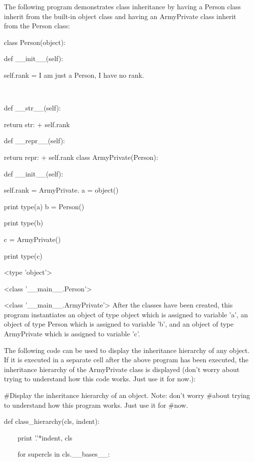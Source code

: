 \documentclass[12pt,oneside]{book}
\begin{document}
The following program demonstrates class inheritance by having a Person class inherit from the built{}-in object class and having an ArmyPrivate class inherit from the Person class: 

class Person(object):

 def \_\_init\_\_(self):

  self.rank = {\textquotedbl}I am just a Person, I have no rank.{\textquotedbl}

\ \ 

 def \_\_str\_\_(self):

  return {\textquotedbl}str: {\textquotedbl} + self.rank

  

 def \_\_repr\_\_(self):

  return {\textquotedbl}repr: {\textquotedbl} + self.rank
class ArmyPrivate(Person):

 def \_\_init\_\_(self):

  self.rank = {\textquotedbl}ArmyPrivate.{\textquotedbl}
a = object()

print type(a)
b = Person()

print type(b)


c = ArmyPrivate()

print type(c)

{\textbar}

{\textless}type 'object'{\textgreater}

{\textless}class '\_\_main\_\_.Person'{\textgreater}

{\textless}class '\_\_main\_\_.ArmyPrivate'{\textgreater}
After the classes have been created, this program instantiates an object of type object which is assigned to variable 'a', an object of type Person which is assigned to variable 'b', and an object of type ArmyPrivate which is assigned to variable 'c'. 

The following code can be used to display the inheritance hierarchy of any object. If it is executed in a separate cell after the above program has been executed, the inheritance hierarchy of the ArmyPrivate class is displayed (don't worry about trying to understand how this code works. Just use it for now.): 

\#Display the inheritance hierarchy of an object. Note: don't worry \#about trying to understand how this program works. Just use it for \#now.

def class\_hierarchy(cls, indent):

\ \ \ \ print '.'*indent, cls

\ \ \ \ for supercls in cls.\_\_bases\_\_:
\end{document}

